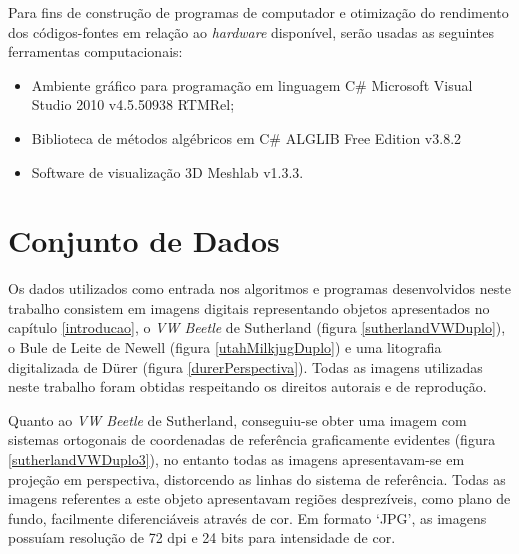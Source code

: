 	Para fins de construção de programas de computador e otimização do rendimento dos códigos-fontes em relação ao \textit{hardware} disponível, serão usadas as seguintes ferramentas computacionais:
\begin{itemize}
	\item Ambiente gráfico para programação em linguagem C\# Microsoft Visual Studio 2010 v4.5.50938 RTMRel\textregistered;
	\item Biblioteca de métodos algébricos em C\# ALGLIB Free Edition v3.8.2
	\item Software de visualização 3D Meshlab v1.3.3.
\end{itemize}

\section{Conjunto de Dados}

	Os dados utilizados como entrada nos algoritmos e programas desenvolvidos neste trabalho consistem em imagens digitais representando objetos apresentados no capítulo \ref{introducao}, o \textit{VW Beetle} de Sutherland (figura \ref{sutherlandVWDuplo}), o Bule de Leite de Newell (figura \ref{utahMilkjugDuplo}) e uma litografia digitalizada de Dürer (figura \ref{durerPerspectiva}). Todas as imagens utilizadas neste trabalho foram obtidas respeitando os direitos autorais e de reprodução.
	
	Quanto ao \textit{VW Beetle} de Sutherland, conseguiu-se obter uma imagem com sistemas ortogonais de coordenadas de referência graficamente evidentes (figura \ref{sutherlandVWDuplo3}), no entanto todas as imagens apresentavam-se em projeção em perspectiva, distorcendo as linhas do sistema de referência. Todas as imagens referentes a este objeto apresentavam regiões desprezíveis, como plano de fundo, facilmente diferenciáveis através de cor. Em formato `JPG', as imagens possuíam resolução de 72 dpi e 24 bits para intensidade de cor.

